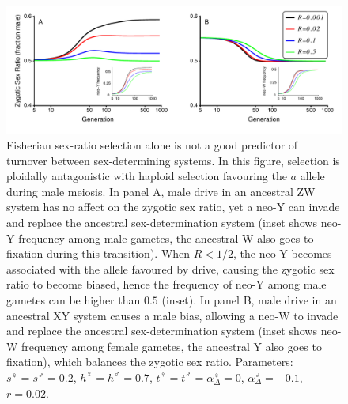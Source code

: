 \documentclass[12pt]{article}
\begin{document}
\begin{figure}[!h]
\centering
\includegraphics[width=\linewidth]{Temporal_SR}
\caption{
Fisherian sex-ratio selection alone is not a good predictor of turnover between sex-determining systems.
In this figure, selection is ploidally antagonistic with haploid selection favouring the $a$ allele during male meiosis.
In panel A, male drive in an ancestral ZW system has no affect on the zygotic sex ratio, yet a neo-Y can invade and replace the ancestral sex-determination system (inset shows neo-Y frequency among male gametes, the ancestral W also goes to fixation during this transition). 
When $R<1/2$, the neo-Y becomes associated with the allele favoured by drive, causing the zygotic sex ratio to become biased, hence the frequency of neo-Y among male gametes can be higher than $0.5$ (inset).
In panel B, male drive in an ancestral XY system causes a male bias, allowing a neo-W to invade and replace the ancestral sex-determination system (inset shows neo-W frequency among female gametes, the ancestral Y also goes to fixation), which balances the zygotic sex ratio.
Parameters:  $s^\female =s^\male = 0.2$, $h^\female = h^\male = 0.7$, $t^\female = t^\male = \alpha^\female_\Delta = 0$, $\alpha^\male_\Delta = -0.1$, $r=0.02$.
}
\label{fig:SexRatioBad}
\end{figure}
\end{document}
